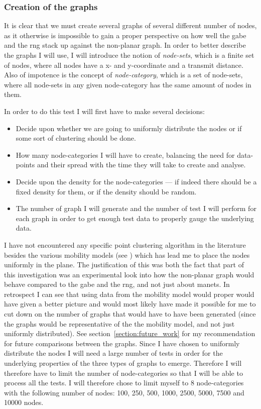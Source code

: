 \subsubsection{Creation of the graphs}
It is clear that we must create several graphs of several different number of nodes, as it otherwise is impossible to gain a proper perspective on how well the \ac{gabe} and the \ac{rng} stack up against the non-planar graph. In order to better describe the graphs I will use, I will introduce the notion of \emph{node-sets}, which is a finite set of nodes, where all nodes have a x- and y-coordinate and a transmit distance. Also of impotence is the concept of \emph{node-category}, which is a set of node-sets, where all node-sets in any given node-category has the same amount of nodes in them. 

In order to do this test I will first have to make several decisions:
\begin{itemize}
\item Decide upon whether we are going to uniformly distribute the nodes or if some sort of clustering should be done. 
\item How many node-categories I will have to create, balancing the need for data-points and their spread with the time they will take to create and analyse.
\item Decide upon the density for the node-categories --- if indeed there should be a fixed density for them, or if the density should be random.
\item The number of graph I will generate and the number of test I will perform for each graph in order to get enough test data to properly gauge the underlying data.
\end{itemize}

I have not encountered any specific point clustering algorithm in the literature besides the various mobility models (see \cite{MobilityAdHocResearch, disasterArea}) which has lead me to place the nodes uniformly in the plane. The justification of this was both the fact that part of this investigation was an experimental look into how the non-planar graph would behave compared to the \ac{gabe} and the \ac{rng}, and not just about \acp{manet}. In retrospect I can see that using data from the mobility model would proper would have given a better picture and would most likely have made it possible for me to cut down on the number of graphs that would have to have been generated (since the graphs would be representative of the the mobility model, and not just uniformly distributed). See section~\ref{section:future_work} for my recommendation for future comparisons between the graphs.   
Since I have chosen to uniformly distribute the nodes I will need a large number of tests in order for the underlying properties of the three types of graphs to emerge. Therefore I will therefore have to limit the number of node-categories so that I will be able to process all the tests. I will therefore chose to limit myself to 8 node-categories with the following number of nodes: 100, 250, 500, 1000, 2500, 5000, 7500 and 10000 nodes.

